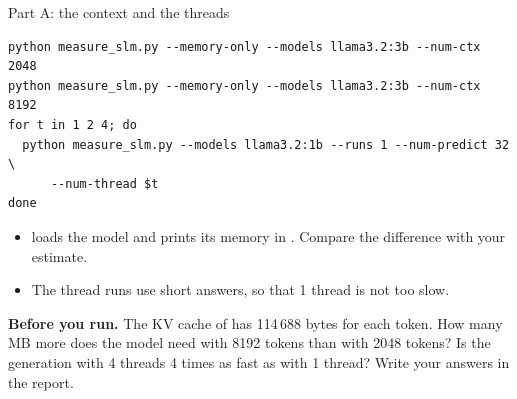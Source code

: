 \begin{frame}[fragile]{Part A: the context and the threads}
\begin{lstlisting}[style=shell]
python measure_slm.py --memory-only --models llama3.2:3b --num-ctx 2048
python measure_slm.py --memory-only --models llama3.2:3b --num-ctx 8192
for t in 1 2 4; do
  python measure_slm.py --models llama3.2:1b --runs 1 --num-predict 32 \
      --num-thread $t
done
\end{lstlisting}
  \small
  \begin{itemize}
    \item {} loads the model and prints its memory in
          \code{ollama ps}. Compare the difference with your estimate.
    \item The thread runs use short answers, so that 1 thread is not too
          slow.
  \end{itemize}
  \begin{exerciseblock}
    \textbf{Before you run.} The KV cache of  has 114\,688
    bytes for each token. How many MB more does the model need with 8192
    tokens than with 2048 tokens? Is the generation with 4 threads 4 times as
    fast as with 1 thread? Write your answers in the report.
  \end{exerciseblock}
\end{frame}

